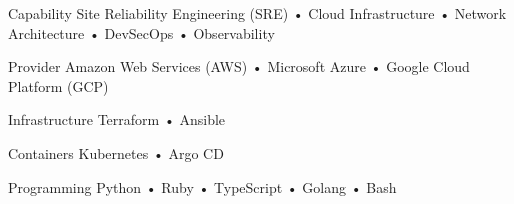 

\begin{cvskills}

  \cvskill
    {Capability} %
    {Site Reliability Engineering (SRE) • Cloud Infrastructure • Network Architecture • DevSecOps • Observability} %

  \cvskill
    {Provider} %
    {Amazon Web Services (AWS) • Microsoft Azure • Google Cloud Platform (GCP)} %

  \cvskill
    {Infrastructure} %
    {Terraform • Ansible} %

  \cvskill
    {Containers} %
    {Kubernetes • Argo CD} %

  \cvskill
    {Programming} %
    {Python • Ruby • TypeScript • Golang • Bash} %

\end{cvskills}

